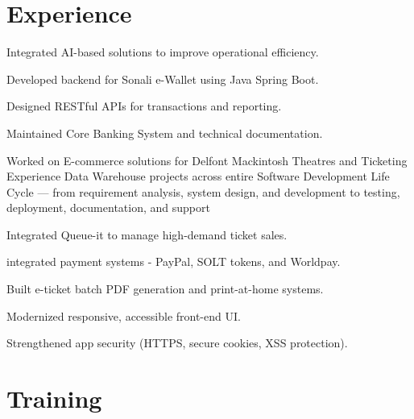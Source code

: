 \documentclass[]{plushcv}
\begin{document}
\begin{minipage}[t]{0.63\textwidth} 



\section{Experience}
\vspace{\topsep}
\begin{tightemize}
\sectionsep
\item Integrated AI-based solutions to improve operational efficiency.
\item Developed backend for Sonali e-Wallet using Java Spring Boot.
\item Designed RESTful APIs for transactions and reporting.
\item Maintained Core Banking System and technical documentation.
\end{tightemize}
\sectionsep

\vspace{\topsep}
\begin{tightemize}
\item Worked on E-commerce solutions for Delfont Mackintosh Theatres and Ticketing Experience Data Warehouse projects across entire Software Development Life Cycle — from requirement analysis, system design, and development to testing, deployment, documentation, and support 
\item Integrated Queue-it to manage high-demand ticket sales.
\item integrated payment systems - PayPal, SOLT tokens, and Worldpay.
\item Built e-ticket batch PDF generation and print-at-home systems.
\item Modernized responsive, accessible front-end UI.
\item Strengthened app security (HTTPS, secure cookies, XSS protection).
\end{tightemize}
\sectionsep



\section{Training}
\vspace{\topsep}
\begin{tightemize}


\end{tightemize}
\end{minipage}
\end{document}
